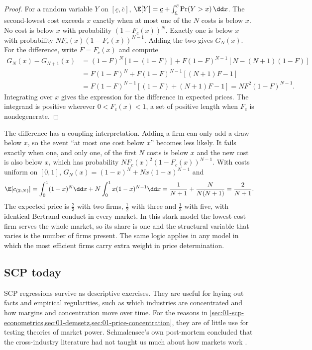 \begin{proof}
For a random variable $Y$ on $[\underline c, \bar c]$, $\E[Y] = \underline c + \int_{\underline c}^{\bar
c} \Pr(Y > x)\, \dd x$. The second-lowest cost exceeds $x$ exactly when at most one of the $N$ costs is
below $x$. No cost is below $x$ with probability $(1 - F_c(x))^N$. Exactly one is below $x$ with
probability $N F_c(x)(1 - F_c(x))^{N - 1}$. Adding the two gives $G_N(x)$. For the difference, write $F =
F_c(x)$ and compute
\begin{align*}
G_N(x) - G_{N+1}(x)
 &= (1 - F)^N \left[1 - (1 - F)\right] + F (1 - F)^{N - 1} \left[N - (N + 1)(1 - F)\right] \\
 &= F (1 - F)^N + F (1 - F)^{N - 1} \left[(N + 1)F - 1\right] \\
 &= F (1 - F)^{N - 1} \left[(1 - F) + (N + 1)F - 1\right] = N F^2 (1 - F)^{N - 1} .
\end{align*}
Integrating over $x$ gives the expression for the difference in expected prices. The integrand is
positive wherever $0 < F_c(x) < 1$, a set of positive length when $F_c$ is nondegenerate.
\end{proof}

The difference has a coupling interpretation. Adding a firm can only add a draw below $x$, so the event
``at most one cost below $x$'' becomes less likely. It fails exactly when one, and only one, of the first
$N$ costs is below $x$ and the new cost is also below $x$, which has probability
$N F_c(x)^2 (1 - F_c(x))^{N - 1}$. With costs
uniform on $[0, 1]$, $G_N(x) = (1 - x)^N + N x (1 - x)^{N - 1}$ and
\[
\E[c_{(2:N)}] = \int_0^1 (1 - x)^N \dd x + N \int_0^1 x (1 - x)^{N - 1} \dd x
 = \frac{1}{N + 1} + \frac{N}{N(N + 1)} = \frac{2}{N + 1}.
\]
The expected price is $\frac{2}{3}$ with two firms, $\frac{1}{2}$ with three and $\frac{1}{3}$ with five,
with identical Bertrand conduct in every market. In this stark model the lowest-cost firm serves the
whole market, so its share is one and the structural variable that varies is the number of firms present.
The same logic applies in any model in which the most efficient firms carry extra weight in price
determination.

\subsection{SCP today}\label{sec:01-scp-today}

SCP regressions survive as descriptive exercises. They are useful for laying out facts and empirical
regularities, such as which industries are concentrated and how margins and concentration move over
time. For the reasons in \cref{sec:01-scp-econometrics,sec:01-demsetz,sec:01-price-concentration}, they
are of little use for testing theories of market power. Schmalensee's own post-mortem concluded that the
cross-industry literature had not taught us much about how markets work
\citep[p.~160]{EinavLevin2010}.

